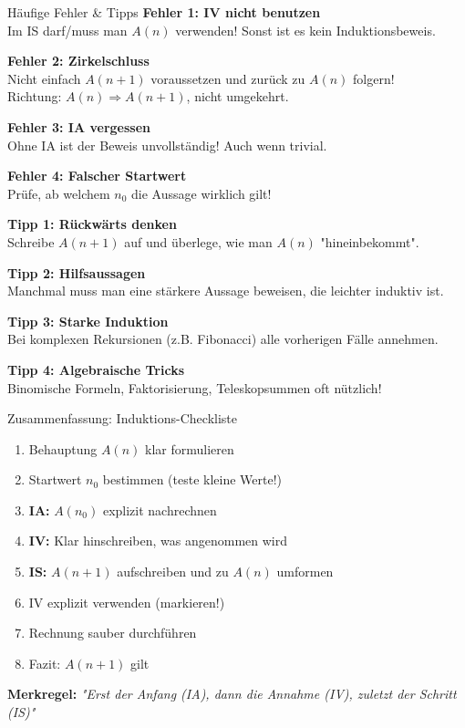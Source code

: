 \documentclass[a4paper, fontsize=7pt]{scrartcl}
\begin{document}
\begin{subbox}{Häufige Fehler \& Tipps}
\textbf{Fehler 1: IV nicht benutzen}\\
Im IS darf/muss man $A(n)$ verwenden! Sonst ist es kein Induktionsbeweis.

\textbf{Fehler 2: Zirkelschluss}\\
Nicht einfach $A(n+1)$ voraussetzen und zurück zu $A(n)$ folgern!\\
Richtung: $A(n) \Rightarrow A(n+1)$, nicht umgekehrt.

\textbf{Fehler 3: IA vergessen}\\
Ohne IA ist der Beweis unvollständig! Auch wenn trivial.

\textbf{Fehler 4: Falscher Startwert}\\
Prüfe, ab welchem $n_0$ die Aussage wirklich gilt!

\textbf{Tipp 1: Rückwärts denken}\\
Schreibe $A(n+1)$ auf und überlege, wie man $A(n)$ "hineinbekommt".

\textbf{Tipp 2: Hilfsaussagen}\\
Manchmal muss man eine stärkere Aussage beweisen, die leichter induktiv ist.

\textbf{Tipp 3: Starke Induktion}\\
Bei komplexen Rekursionen (z.B. Fibonacci) alle vorherigen Fälle annehmen.

\textbf{Tipp 4: Algebraische Tricks}\\
Binomische Formeln, Faktorisierung, Teleskopsummen oft nützlich!
\end{subbox}

\begin{mainbox}{Zusammenfassung: Induktions-Checkliste}
\begin{enumerate}
  \item[\textbf{-}] Behauptung $A(n)$ klar formulieren
  \item[\textbf{-}] Startwert $n_0$ bestimmen (teste kleine Werte!)
  \item[\textbf{-}] \textbf{IA:} $A(n_0)$ explizit nachrechnen
  \item[\textbf{-}] \textbf{IV:} Klar hinschreiben, was angenommen wird
  \item[\textbf{-}] \textbf{IS:} $A(n+1)$ aufschreiben und zu $A(n)$ umformen
  \item[\textbf{-}] IV explizit verwenden (markieren!)
  \item[\textbf{-}] Rechnung sauber durchführen
  \item[\textbf{-}] Fazit: $A(n+1)$ gilt \checkmark
\end{enumerate}

\textbf{Merkregel:} \textit{"Erst der Anfang (IA), dann die Annahme (IV), zuletzt der Schritt (IS)"}
\end{mainbox}
\end{document}
